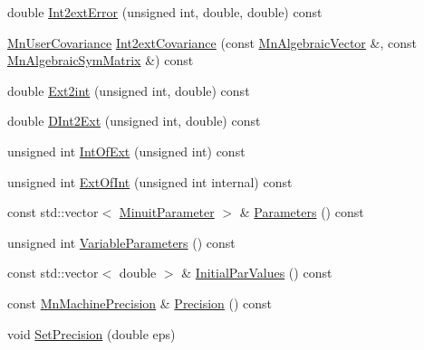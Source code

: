 \begin{DoxyCompactItemize}
\item 
double \mbox{\hyperlink{classROOT_1_1Minuit2_1_1MnUserTransformation_ad900f367f4d2c5df13f899dd55bdf212}{Int2ext\+Error}} (unsigned int, double, double) const
\item 
\mbox{\hyperlink{classROOT_1_1Minuit2_1_1MnUserCovariance}{Mn\+User\+Covariance}} \mbox{\hyperlink{classROOT_1_1Minuit2_1_1MnUserTransformation_a10f2146be0a2c991243dd2f70a943a15}{Int2ext\+Covariance}} (const \mbox{\hyperlink{namespaceROOT_1_1Minuit2_a62ed97730a1ca8d3fbaec64a19aa11c9}{Mn\+Algebraic\+Vector}} \&, const \mbox{\hyperlink{namespaceROOT_1_1Minuit2_a9e74ad97f5537a2e80e52b04d98ecc6e}{Mn\+Algebraic\+Sym\+Matrix}} \&) const
\item 
double \mbox{\hyperlink{classROOT_1_1Minuit2_1_1MnUserTransformation_a0296bec1f14bc7ee514527b88aff0760}{Ext2int}} (unsigned int, double) const
\item 
double \mbox{\hyperlink{classROOT_1_1Minuit2_1_1MnUserTransformation_a35938acd16a546d398ce1c00ffc98c44}{D\+Int2\+Ext}} (unsigned int, double) const
\item 
unsigned int \mbox{\hyperlink{classROOT_1_1Minuit2_1_1MnUserTransformation_a69f58a6d486e2a57789cd8a8445cf23d}{Int\+Of\+Ext}} (unsigned int) const
\item 
unsigned int \mbox{\hyperlink{classROOT_1_1Minuit2_1_1MnUserTransformation_a114bf6d4e97b6f8bf5f3788e30e63002}{Ext\+Of\+Int}} (unsigned int internal) const
\item 
const std\+::vector$<$ \mbox{\hyperlink{classROOT_1_1Minuit2_1_1MinuitParameter}{Minuit\+Parameter}} $>$ \& \mbox{\hyperlink{classROOT_1_1Minuit2_1_1MnUserTransformation_a29366e4f3594d0cf3b5d4dc0b1597ad6}{Parameters}} () const
\item 
unsigned int \mbox{\hyperlink{classROOT_1_1Minuit2_1_1MnUserTransformation_a6e88cb38d0d19f4cf9ed3dd8102eebef}{Variable\+Parameters}} () const
\item 
const std\+::vector$<$ double $>$ \& \mbox{\hyperlink{classROOT_1_1Minuit2_1_1MnUserTransformation_a30432dec33ea27b75059a6ce28dfd5cd}{Initial\+Par\+Values}} () const
\item 
const \mbox{\hyperlink{classROOT_1_1Minuit2_1_1MnMachinePrecision}{Mn\+Machine\+Precision}} \& \mbox{\hyperlink{classROOT_1_1Minuit2_1_1MnUserTransformation_af9d893a428a4f4d94dfef1bdd3e9936e}{Precision}} () const
\item 
void \mbox{\hyperlink{classROOT_1_1Minuit2_1_1MnUserTransformation_aa80f289974f19753a2912a8eb6311f53}{Set\+Precision}} (double eps)
\item 

\end{DoxyCompactItemize}
